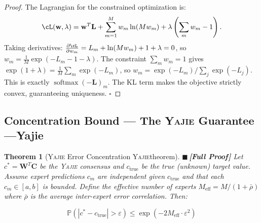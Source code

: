 \documentclass[12pt,a4paper]{article}
\newtheorem{theorem}{Theorem}[section]
\theoremstyle{definition}
\newcommand{\rigorFull}{{\color{rigorcolor}$\blacksquare$\,\textbf{[Full Proof]}}}
\newcommand{\Yajie}{\textsc{Yajie}}
\DeclareMathOperator{\softmax}{softmax}
\newcommand{\Pbb}{\mathbb{P}}
\newcommand{\abs}[1]{\left|#1\right|}
\newcommand{\mat}[1]{\mathbf{#1}}
\begin{document}
\begin{proof}
The Lagrangian for the constrained optimization is:
\[
\cL(\mat{w}, \lambda) = \mat{w}^T \mat{L} + \sum_{m=1}^{M} w_m \ln(M w_m) + \lambda\left(\sum_{m} w_m - 1\right).
\]
Taking derivatives: $\frac{\partial \cL}{\partial w_m} = L_m + \ln(M w_m) + 1 + \lambda = 0$,
so $w_m = \frac{1}{M}\exp(-L_m - 1 - \lambda)$. The constraint $\sum_m w_m = 1$ gives
$\exp(1+\lambda) = \frac{1}{M}\sum_m \exp(-L_m)$, so $w_m = \exp(-L_m)/\sum_j \exp(-L_j)$.
This is exactly $\softmax(-\mat{L})_m$. The KL term makes the objective strictly convex,
guaranteeing uniqueness. \hfill $\square$
\end{proof}

\subsection{Concentration Bound — The \Yajie{} Guarantee ---Yajie}

\begin{theorem}[\Yajie{} Error Concentration \Yajie{}theorem]\label{thm:yajie_concentration}
\rigorFull
Let $c^* = \mat{W}^T \mat{C}$ be the \Yajie{} consensus and $c_{\text{true}}$ be the 
true (unknown) target value. Assume expert predictions $c_m$ are independent given 
$c_{\text{true}}$ and that each $c_m \in [a, b]$ is bounded. Define the effective 
number of experts $M_{\text{eff}} = M/(1 + \bar{\rho})$ where $\bar{\rho}$ is the 
average inter-expert error correlation. Then:

\begin{equation}\label{eq:yajie_bound}
    \Pbb\left(\abs{c^* - c_{\text{true}}} > \varepsilon\right) \leq \exp\!\left(-2 M_{\text{eff}} \cdot \varepsilon^2\right)
\end{equation}
\end{theorem}
\end{document}
